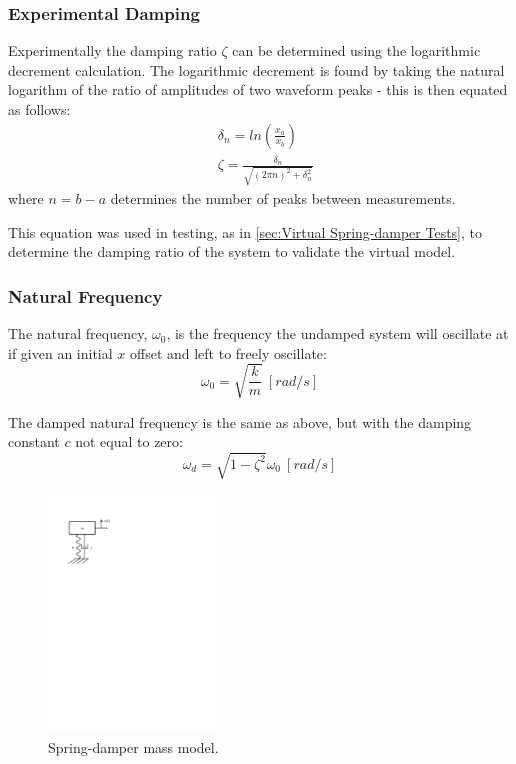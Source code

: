 \subsubsection{Experimental Damping}
Experimentally the damping ratio $\zeta$ can be determined using the logarithmic decrement calculation. The logarithmic decrement is found by taking the natural logarithm of the ratio of amplitudes of two waveform peaks - this is then equated as follows:
\begin{equation}
\begin{aligned}
&\delta_n = ln(\frac{x_a}{x_{b}}) \\
&\zeta = \frac{\delta_n}{\sqrt{(2 \pi n)^2 + \delta_n^2}}
\end{aligned}
\end{equation}
where $n = b-a$ determines the number of peaks between measurements.

This equation was used in testing, as in \cref{sec:Virtual Spring-damper Tests}, to determine the damping ratio of the system to validate the virtual model.

\subsubsection{Natural Frequency}
The natural frequency, $\omega_0$, is the frequency the undamped system will oscillate at if given an initial $x$ offset and left to freely oscillate:
\begin{equation} \label{eq:natural-freq}
\omega_0 = \sqrt{\frac{k}{m}}\ [rad/s]
\end{equation}

The damped natural frequency is the same as above, but with the damping constant $c$ not equal to zero:
\begin{equation}
\omega_d = \sqrt{1 - \zeta^2}\omega_0\ [rad/s]
\end{equation}

\begin{figure}
\centering
\includegraphics[clip, trim=2cm 20cm 13cm 2cm, page = 1, width=0.4\textwidth]{images/geometry/spring-damper-mass} 
\caption{Spring-damper mass model.}
\label{fig:Spring-damper mass model}
\end{figure}

